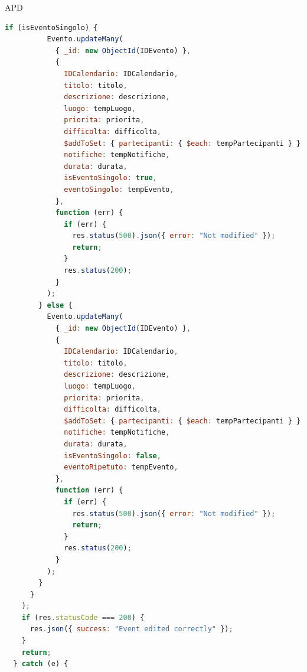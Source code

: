 \begin{listaPersonale} {APD}
\begin{listaPersonale2}[APD]{}
\begin{lstlisting}[language=JavaScript]
        if (isEventoSingolo) {
          Evento.updateMany(
            { _id: new ObjectId(IDEvento) },
            {
              IDCalendario: IDCalendario,
              titolo: titolo,
              descrizione: descrizione,
              luogo: tempLuogo,
              priorita: priorita,
              difficolta: difficolta,
              $addToSet: { partecipanti: { $each: tempPartecipanti } },
              notifiche: tempNotifiche,
              durata: durata,
              isEventoSingolo: true,
              eventoSingolo: tempEvento,
            },
            function (err) {
              if (err) {
                res.status(500).json({ error: "Not modified" });
                return;
              }
              res.status(200);
            }
          );
        } else {
          Evento.updateMany(
            { _id: new ObjectId(IDEvento) },
            {
              IDCalendario: IDCalendario,
              titolo: titolo,
              descrizione: descrizione,
              luogo: tempLuogo,
              priorita: priorita,
              difficolta: difficolta,
              $addToSet: { partecipanti: { $each: tempPartecipanti } },
              notifiche: tempNotifiche,
              durata: durata,
              isEventoSingolo: false,
              eventoRipetuto: tempEvento,
            },
            function (err) {
              if (err) {
                res.status(500).json({ error: "Not modified" });
                return;
              }
              res.status(200);
            }
          );
        }
      }
    );
    if (res.statusCode === 200) {
      res.json({ success: "Event edited correctly" });
    }
    return;
  } catch (e) {
    

\end{lstlisting}
\end{listaPersonale2}
\end{listaPersonale}
